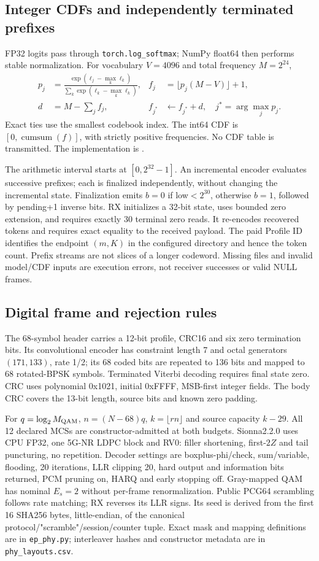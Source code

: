 \documentclass[10pt,letterpaper]{article}
\begin{document}
\subsection{Integer CDFs and independently terminated prefixes}
FP32 logits pass through \texttt{torch.log\_softmax}; NumPy float64 then performs stable normalization. For vocabulary $V=4096$ and total frequency $M=2^{24}$,
\begin{align*}
p_j&=\frac{\exp(\ell_j-\max_k\ell_k)}{\sum_k\exp(\ell_k-\max_k\ell_k)},&
f_j&=\lfloor p_j(M-V)\rfloor+1,\\
d&=M-\sum_j f_j,&f_{j^*}&\leftarrow f_{j^*}+d,\quad j^*=\arg\max_jp_j.
\end{align*}
Exact ties use the smallest codebook index. The int64 CDF is $[0,\operatorname{cumsum}(f)]$, with strictly positive frequencies. No CDF table is transmitted. The implementation is .

The arithmetic interval starts at $[0,2^{32}-1]$. An incremental encoder evaluates successive prefixes; each is finalized independently, without changing the incremental state. Finalization emits $b=0$ if low$<2^{30}$, otherwise $b=1$, followed by pending+1 inverse bits. RX initializes a 32-bit state, uses bounded zero extension, and requires exactly 30 terminal zero reads. It re-encodes recovered tokens and requires exact equality to the received payload. The paid Profile ID identifies the endpoint $(m,K)$ in the configured directory and hence the token count. Prefix streams are not slices of a longer codeword. Missing files and invalid model/CDF inputs are execution errors, not receiver successes or valid NULL frames.

\subsection{Digital frame and rejection rules}
The 68-symbol header carries a 12-bit profile, CRC16 and six zero termination bits. Its convolutional encoder has constraint length 7 and octal generators $(171,133)$, rate 1/2; its 68 coded bits are repeated to 136 bits and mapped to 68 rotated-BPSK symbols. Terminated Viterbi decoding requires final state zero. CRC uses polynomial 0x1021, initial 0xFFFF, MSB-first integer fields. The body CRC covers the 13-bit length, source bits and known zero padding.

For $q=\log_2M_{\rm QAM}$, $n=(N-68)q$, $k=\lfloor rn\rfloor$ and source capacity $k-29$. All 12 declared MCSs are constructor-admitted at both budgets. Sionna2.2.0 uses CPU FP32, one 5G-NR LDPC block and RV0: filler shortening, first-$2Z$ and tail puncturing, no repetition. Decoder settings are boxplus-phi/check, sum/variable, flooding, 20 iterations, LLR clipping 20, hard output and information bits returned, PCM pruning on, HARQ and early stopping off. Gray-mapped QAM has nominal $E_s=2$ without per-frame renormalization. Public PCG64 scrambling follows rate matching; RX reverses its LLR signs. Its seed is derived from the first 16 SHA256 bytes, little-endian, of the canonical protocol/"scramble"/session/counter tuple. Exact mask and mapping definitions are in \texttt{ep\_phy.py}; interleaver hashes and constructor metadata are in \texttt{phy\_layouts.csv}.
\end{document}

